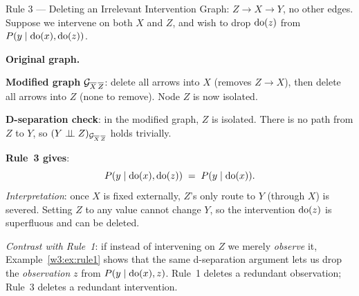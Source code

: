 \documentclass[master.tex]{subfiles}
\begin{document}
\begin{example}{Rule 3 --- Deleting an Irrelevant Intervention}
\label{w3:ex:rule3}
Graph: $Z \to X \to Y$, no other edges.  Suppose we intervene on both $X$
and $Z$, and wish to drop $\mathrm{do}(z)$ from $P(y \mid \mathrm{do}(x), \mathrm{do}(z))$.

\medskip
\noindent\textbf{Original graph.}
\begin{center}
\end{center}

\noindent\textbf{Modified graph} $\mathcal{G}_{\overline{X}\,\overline{Z}}$:
delete all arrows into $X$ (removes $Z \to X$), then delete all arrows
into $Z$ (none to remove).  Node $Z$ is now isolated.

\begin{center}
\end{center}

\noindent\textbf{D-separation check}: in the modified graph, $Z$ is
isolated.  There is no path from $Z$ to $Y$, so
$(Y \perp\!\!\!\perp Z)_{\mathcal{G}_{\overline{X}\,\overline{Z}}}$ holds trivially.
\checkmark

\noindent\textbf{Rule~3 gives}:
\[
  P(y \mid \mathrm{do}(x), \mathrm{do}(z)) \;=\; P(y \mid \mathrm{do}(x)).
\]
\textit{Interpretation}: once $X$ is fixed externally, $Z$'s only route
to $Y$ (through $X$) is severed.  Setting $Z$ to any value cannot change
$Y$, so the intervention $\mathrm{do}(z)$ is superfluous and can be deleted.

\textit{Contrast with Rule~1}: if instead of intervening on $Z$ we merely
\emph{observe} it, Example~\ref{w3:ex:rule1} shows that the same
d-separation argument lets us drop the \emph{observation} $z$ from
$P(y \mid \mathrm{do}(x), z)$.  Rule~1 deletes a redundant observation;
Rule~3 deletes a redundant intervention.
\end{example}
\end{document}
